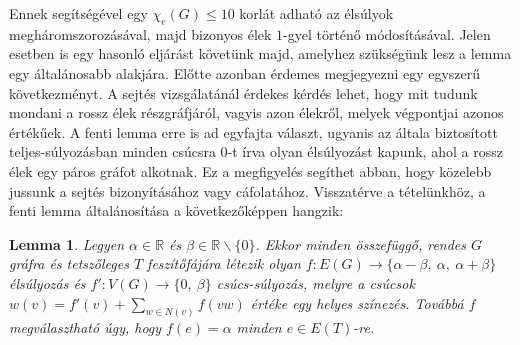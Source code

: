 \documentclass[12pt, a4paper]{report}
\newtheorem{lem}[tét]{Lemma}
\theoremstyle{remark}
\theoremstyle{definition}
\begin{document}
Ennek segítségével egy $\chi_e(G) \leq 10$ korlát adható az élsúlyok megháromszorozásával, majd bizonyos élek $1$-gyel történő módosításával. Jelen esetben is egy hasonló eljárást követünk majd, amelyhez szükségünk lesz a lemma egy általánosabb alakjára. Előtte azonban érdemes megjegyezni egy egyszerű következményt. A sejtés vizsgálatánál érdekes kérdés lehet, hogy mit tudunk mondani a rossz élek részgráfjáról, vagyis azon élekről, melyek végpontjai azonos értékűek. A fenti lemma erre is ad egyfajta választ, ugyanis az általa biztosított teljes-súlyozásban minden csúcsra $0$-t írva olyan élsúlyozást kapunk, ahol a rossz élek egy páros gráfot alkotnak. Ez a megfigyelés segíthet abban, hogy közelebb jussunk a sejtés bizonyításához vagy cáfolatához. Visszatérve a tételünkhöz, a fenti lemma általánosítása a következőképpen hangzik:

\begin{lem} \label{lem:edge6treemixed}
Legyen $\alpha \in \mathbb{R}$ és $\beta \in \mathbb{R} \smallsetminus \lbrace 0 \rbrace$. Ekkor minden összefüggő, rendes $G$ gráfra és tetszőleges $T$ feszítőfájára létezik olyan $f:E(G) \rightarrow \lbrace \alpha - \beta,\ \alpha,\ \alpha + \beta \rbrace$ élsúlyozás és $f':V(G) \rightarrow \lbrace 0,\ \beta \rbrace$ csúcs-súlyozás, melyre a csúcsok $w(v) = f'(v) + \sum\limits_{w \in N(v)} f(vw)$ értéke egy helyes színezés. Továbbá $f$ megválasztható úgy, hogy $f(e) = \alpha$ minden $e \in E(T)$-re.
\end{lem}
\end{document}
